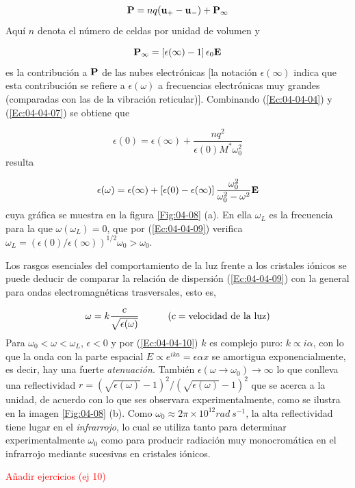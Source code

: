 \begin{eqnarray}
	\mathbf{P} = n q (\mathbf{u}_+ - \mathbf{u}_-) + \mathbf{P}_\infty
\end{eqnarray}
Aquí $n$ denota el número de celdas por unidad de volumen y 

\begin{equation}
	\mathbf{P}_\infty = \left[ \epsilon (\infty) -1  \right] \epsilon_0 \mathbf{E}\label{Ec:04-04-07}
\end{equation}
es la contribución a $\mathbf{P}$ de las nubes electrónicas [la notación $\epsilon (\infty)$ indica que esta contribución se refiere a $\epsilon (\omega)$ a frecuencias electrónicas muy grandes (comparadas con las de la vibración reticular)]. Combinando (\ref{Ec:04-04-04}) y (\ref{Ec:04-04-07}) se obtiene que

\begin{equation}
	\epsilon(0) = \epsilon(\infty)  + \frac{nq^2}{\epsilon(0) M^*\omega_0^2}
\end{equation}
resulta 

\begin{equation}
	\epsilon (\omega) = \epsilon(\infty) + \left[ \epsilon(0)-\epsilon(\infty) \right] \frac{\omega_0^2}{\omega_0^2 - \omega^2} \mathbf{E}\label{Ec:04-04-09}
\end{equation}
cuya gráfica se muestra en la figura \ref{Fig:04-08} (a). En ella $\omega_L$ es la frecuencia para la que $\omega(\omega_L)=0$, que por  (\ref{Ec:04-04-09}) verifica $\omega_L = (\epsilon(0)/\epsilon(\infty))^{1/2} \omega_0 >\omega_0$.


Los rasgos esenciales del comportamiento de la luz frente a los cristales iónicos se puede deducir de comparar la relación de dispersión (\ref{Ec:04-04-09}) con la general para ondas electromagnéticas trasversales, esto es,

\begin{equation}
	\omega = k \frac{c}{\sqrt{\epsilon(\omega)}} \quad \quad \quad (c = \text{velocidad de la luz})	\label{Ec:04-04-10}
\end{equation}
Para $\omega_0 < \omega < \omega_L$, $\epsilon <0$ y por (\ref{Ec:04-04-10}) $k$ es complejo puro: $k \propto i \alpha$, con lo que la onda con la parte espacial $E \propto e^{ika} = \epsilon{\alpha x}$ se amortigua exponencialmente, es decir, hay una fuerte \textit{atenuación}. También $\epsilon (\omega \rightarrow \omega_0) \rightarrow \infty$ lo que conlleva una reflectividad $r= (\sqrt{\epsilon(\omega)}-1)^2 / (\sqrt{\epsilon(\omega)}-1)^2$ que se acerca a la unidad, de acuerdo con lo que ses observara experimentalmente, como se ilustra en la imagen \ref{Fig:04-08} (b). Como $\omega_0\approx 2 \pi \times 10^{12} \unit{rad \ s^{-1}}$, la alta reflectividad tiene lugar en el \textit{infrarrojo}, lo cual se utiliza tanto para determinar experimentalmente $\omega_0$ como para producir radiación muy monocromática en el infrarrojo mediante sucesivas en cristales iónicos.

\begin{Anotacion}
	\textcolor{red}{Añadir ejercicios (ej 10)}
\end{Anotacion}
